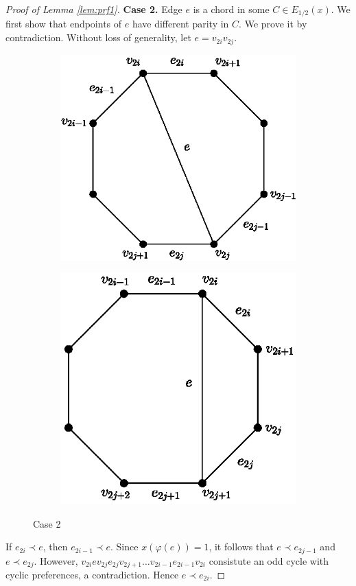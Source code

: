 \documentclass[11pt]{article}
\numberwithin{theorem}{section}
\begin{document}
\begin{proof}[Proof of Lemma \ref{lem:prf1}]
\textbf{Case 2.} Edge $e$ is a chord in some $C\in E_{1/2}(x)$. We first show that endpoints of $e$ have different parity in $C$. We prove it by contradiction. Without loss of generality, let $e=v_{2i}v_{2j}$.
\begin{figure}
\centering
\begin{subfigure}{.4\textwidth}
  \centering
  \includegraphics[width=.85\linewidth]{KernelMengerianO-fig1a}
  \caption{}
  \label{fig1a}
\end{subfigure}%
\begin{subfigure}{.4\textwidth}
  \centering
  \includegraphics[width=.845\linewidth]{KernelMengerianO-fig1b}
  \caption{}
  \label{fig1b}
\end{subfigure}
\caption{Case 2}
\end{figure}
If $e_{2i}\prec e$, then $e_{2i-1}\prec e$. Since $x(\varphi(e))=1$, it follows that $e\prec e_{2j-1}$ and $e\prec e_{2j}$. However, $v_{2i} e v_{2j} e_{2j} v_{2j+1} \ldots v_{2i-1} e_{2i-1} v_{2i}$ consistute an odd cycle with cyclic preferences, a contradiction. Hence $e\prec e_{2i}$.


\end{proof}
\end{document}
